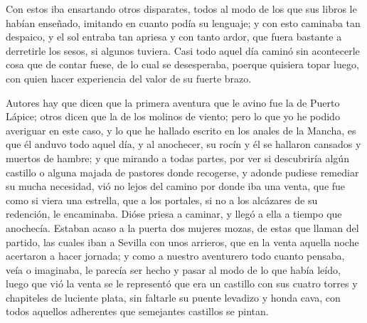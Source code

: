    Con estos iba ensartando otros disparates, todos al modo de los
    que sus libros le habían enseñado, imitando en cuanto podía su
    lenguaje; y con esto caminaba tan despaico, y el sol entraba tan
    apriesa y con tanto ardor, que fuera bastante a derretirle los
    sesos, si algunos tuviera. Casi todo aquel día caminó sin
    acontecerle cosa que de contar fuese, de lo cual se desesperaba,
    poerque quisiera topar luego, con quien hacer experiencia del
    valor de su fuerte brazo.
    
    Autores hay que dicen que la primera aventura que le avino fue la
    de Puerto Lápice; otros dicen que la de los molinos de viento;
    pero lo que yo he podido averiguar en este caso, y lo que he
    hallado escrito en los anales de la Mancha, es que él anduvo todo
    aquel día, y al anochecer, su rocín y él se hallaron cansados y
    muertos de hambre; y que mirando a todas partes, por ver si
    descubriría algún castillo o alguna majada de pastores donde
    recogerse, y adonde pudiese remediar su mucha necesidad, vió no
    lejos del camino por donde iba una venta, que fue como si viera
    una estrella, que a los portales, si no a los alcázares de su
    redención, le encaminaba. Dióse priesa a caminar, y llegó a ella a
    tiempo que anochecía. Estaban acaso a la puerta dos mujeres mozas,
    de estas que llaman del partido, las cuales iban a Sevilla con
    unos arrieros, que en la venta aquella noche acertaron a hacer
    jornada; y como a nuestro aventurero todo cuanto pensaba, veía o
    imaginaba, le parecía ser hecho y pasar al modo de lo que había
    leído, luego que vió la venta se le representó que era un castillo
    con sus cuatro torres y chapiteles de luciente plata, sin faltarle
    su puente levadizo y honda cava, con todos aquellos adherentes que
    semejantes castillos se pintan.
    
